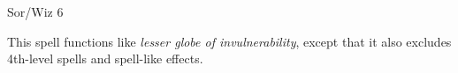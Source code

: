 
\begin{description*}
\item[Level:] Sor/Wiz 6
\end{description*}

This spell functions like \textit{lesser globe of invulnerability}, except that
it also excludes 4th-level spells and spell-like effects.
